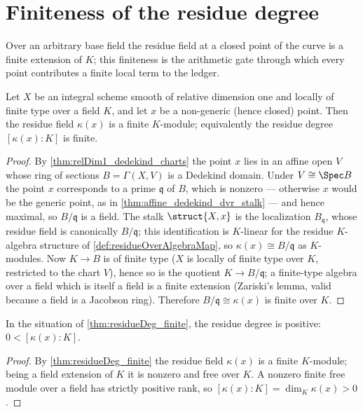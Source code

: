 \section{Finiteness of the residue degree}

Over an arbitrary base field the residue field at a closed point of the curve is a finite extension
of \(K\); this finiteness is the arithmetic gate through which every point contributes a finite
local term to the ledger.

\begin{theorem}
  \label{thm:residueDeg_finite}
  \leanok
  Let \(X\) be an integral scheme smooth of relative dimension one and locally of finite type over a
  field \(K\), and let \(x\) be a non-generic (hence closed) point. Then the residue field
  \(\kappa(x)\) is a finite \(K\)-module; equivalently the residue degree \([\kappa(x):K]\) is
  finite.
\end{theorem}
\begin{proof}
  \leanok
  By \ref{thm:relDim1_dedekind_charts} the point \(x\) lies in an affine open \(V\) whose ring of
  sections \(B = \Gamma(X, V)\) is a Dedekind domain. Under \(V \cong \Spec B\) the point \(x\)
  corresponds to a prime \(\mathfrak q\) of \(B\), which is nonzero --- otherwise \(x\) would be the
  generic point, as in \ref{thm:affine_dedekind_dvr_stalk} --- and hence maximal, so \(B/\mathfrak q\)
  is a field. The stalk \(\struct{X,x}\) is the localization \(B_{\mathfrak q}\), whose residue
  field is canonically \(B/\mathfrak q\); this identification is \(K\)-linear for the residue
  \(K\)-algebra structure of \ref{def:residueOverAlgebraMap}, so \(\kappa(x) \cong B/\mathfrak q\)
  as \(K\)-modules. Now \(K \to B\) is of finite type (\(X\) is locally of finite type over \(K\),
  restricted to the chart \(V\)), hence so is the quotient \(K \to B/\mathfrak q\); a finite-type
  algebra over a field which is itself a field is a finite extension (Zariski's lemma, valid because
  a field is a Jacobson ring). Therefore \(B/\mathfrak q \cong \kappa(x)\) is finite over \(K\).
\end{proof}

\begin{theorem}
  \label{thm:residueDeg_pos}
  \leanok
  In the situation of \ref{thm:residueDeg_finite}, the residue degree is positive:
  \(0 < [\kappa(x):K]\).
\end{theorem}
\begin{proof}
  \leanok
  By \ref{thm:residueDeg_finite} the residue field \(\kappa(x)\) is a finite \(K\)-module; being a
  field extension of \(K\) it is nonzero and free over \(K\). A nonzero finite free module over a
  field has strictly positive rank, so \([\kappa(x):K] = \dim_K \kappa(x) > 0\).
\end{proof}

